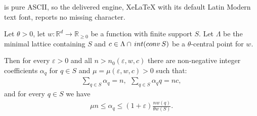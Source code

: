 \documentclass[10pt,a4paper]{amsart}
\newcommand{\R}{\mathbb R}
\newcommand{\conv}{{\rm conv}\,}
\renewcommand{\ge}{\geqslant}
\renewcommand{\le}{\leqslant}
\begin{document}
is pure ASCII, so the delivered engine, XeLaTeX with its default Latin Modern text font, reports no missing character.
\begin{lemma}\label{lm2}
Let $\theta > 0$, let $w: \R^d \rightarrow \R_{\ge 0}$ be a function with finite support $S$. 
Let $\Lambda$ be the minimal lattice containing $S$ and $c \in \Lambda \cap \,{\rm int}(\conv{S})$ be a $\theta$-central point for $w$.

Then for every $\varepsilon > 0$ and all $n > n_0(\varepsilon, w, c)$ there are non-negative integer coefficients $\alpha_q$ for $q \in S$ and $\mu = \mu(\varepsilon, w, c) > 0$ such that:
\begin{align}\label{eqlm}
    \sum_{q \in S} \alpha_q = n,~~    \sum_{q \in S} \alpha_q q = n c, 
\end{align}
and for every $q\in S$ we have 
\begin{align}\label{eqlm2}
    \mu n \le \alpha_q \le  (1 + \varepsilon) \frac{n w(q)}{\theta w(S)}.
\end{align}
\end{lemma}
\end{document}
